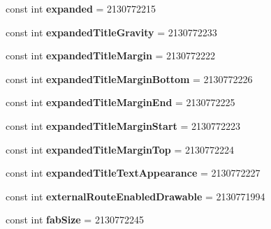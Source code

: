 \begin{DoxyCompactItemize}
const int {\bfseries expanded} = 2130772215
\item 
\mbox{\label{classXaria_1_1Resource_1_1Attribute_ac6c69e04316c728d856795a21566e0c6}} 
const int {\bfseries expanded\+Title\+Gravity} = 2130772233
\item 
\mbox{\label{classXaria_1_1Resource_1_1Attribute_a3c0888570a3b9a371188d5c78085af1a}} 
const int {\bfseries expanded\+Title\+Margin} = 2130772222
\item 
\mbox{\label{classXaria_1_1Resource_1_1Attribute_ab0613c0a757ac90367463889586ca40e}} 
const int {\bfseries expanded\+Title\+Margin\+Bottom} = 2130772226
\item 
\mbox{\label{classXaria_1_1Resource_1_1Attribute_a33d2c6d0e8464bfb834f756b4026b3d2}} 
const int {\bfseries expanded\+Title\+Margin\+End} = 2130772225
\item 
\mbox{\label{classXaria_1_1Resource_1_1Attribute_a77b25900f1c003e65a6b156cb6633a51}} 
const int {\bfseries expanded\+Title\+Margin\+Start} = 2130772223
\item 
\mbox{\label{classXaria_1_1Resource_1_1Attribute_ae061403a0dd12f2e4dd8011dfa6cab91}} 
const int {\bfseries expanded\+Title\+Margin\+Top} = 2130772224
\item 
\mbox{\label{classXaria_1_1Resource_1_1Attribute_a7d107d5a86ca27e625879ad696727293}} 
const int {\bfseries expanded\+Title\+Text\+Appearance} = 2130772227
\item 
\mbox{\label{classXaria_1_1Resource_1_1Attribute_a305962923aa75c499d2a50374f11deb8}} 
const int {\bfseries external\+Route\+Enabled\+Drawable} = 2130771994
\item 
\mbox{\label{classXaria_1_1Resource_1_1Attribute_a6f7cd7d7845609963cfb993f6260e0d2}} 
const int {\bfseries fab\+Size} = 2130772245
\item 
\mbox{\label{classXaria_1_1Resource_1_1Attribute_a739c277d5eacf8f12bd2370f114f21b1}} 

\end{DoxyCompactItemize}

